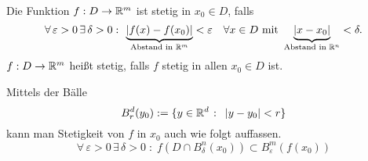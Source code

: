 \documentclass[../ana1.tex]{subfiles}
\begin{document}
\begin{defi}[Stetigkeit]
    Die Funktion \( f: D\rightarrow \mathbb{R}^m \) ist stetig 
    in \( x_0 \in D \), falls
    \[ \forall \, \varepsilon > 0 \,\exists \, \delta > 0 
    \, \colon \, \underbrace{ \left| f(x) - f(x_0) 
    \right|}_{\text{Abstand in } \mathbb{R}^m} < \varepsilon \quad 
    \forall x\in D \text{ mit } \underbrace{\left|x - x_0\right| 
    }_{\text{Abstand in } \mathbb{R}^n} < \delta. \]
    \( f: D\rightarrow \mathbb{R}^m \) heißt stetig, falls \( f \) 
    stetig in allen \(x_0 \in D \) ist.
\end{defi}
\begin{bem}
    Mittels der Bälle 
    \[ B_r^d(y_0) := \{ y\in\mathbb{R}^d \;\colon \; 
    \left|y-y_0\right|<r \} \]
    kann man Stetigkeit von \( f \) in \( x_0 \) auch wie folgt
    auffassen.
    \[ \forall \, \varepsilon > 0 \,\exists \, \delta > 0 
    \;\colon \; f(D\cap B_\delta^n(x_0)) \subset 
    B_\varepsilon^m (f(x_0)) \]
\end{bem}
\end{document}
